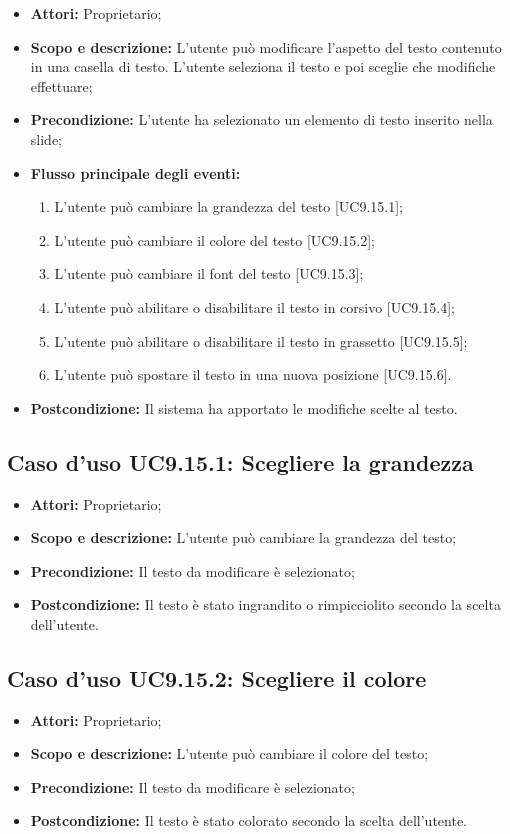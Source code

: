 \begin{itemize}
	\item \textbf{Attori:} Proprietario;
	\item \textbf{Scopo e descrizione:} L'utente può modificare l'aspetto del testo contenuto in una casella di testo. L'utente seleziona il testo e poi sceglie che modifiche effettuare;
	\item \textbf{Precondizione:} L'utente ha selezionato un elemento di testo inserito nella \gls{slide};
	\item \textbf{Flusso principale degli eventi:}
	\begin{enumerate}
		\item L'utente può cambiare la grandezza del testo [UC9.15.1];
		\item L'utente può cambiare il colore del testo [UC9.15.2];
		\item L'utente può cambiare il \gls{font} del testo [UC9.15.3];
		\item L'utente può abilitare o disabilitare il testo in corsivo [UC9.15.4];
		\item L'utente può abilitare o disabilitare il testo in grassetto [UC9.15.5];
		\item L'utente può spostare il testo in una nuova posizione [UC9.15.6].
	\end{enumerate}
	\item \textbf{Postcondizione:} Il sistema ha apportato le modifiche scelte al testo.
\end{itemize}

\subsection{Caso d'uso UC9.15.1: Scegliere la grandezza}
\begin{itemize}
	\item \textbf{Attori:} Proprietario;
	\item \textbf{Scopo e descrizione:} L'utente può cambiare la grandezza del testo;
	\item \textbf{Precondizione:} Il testo da modificare è selezionato;
	\item \textbf{Postcondizione:} Il testo è stato ingrandito o rimpicciolito secondo la scelta dell'utente.
\end{itemize}

\subsection{Caso d'uso UC9.15.2: Scegliere il colore}
\begin{itemize}
	\item \textbf{Attori:} Proprietario;
	\item \textbf{Scopo e descrizione:} L'utente può cambiare il colore del testo;
	\item \textbf{Precondizione:} Il testo da modificare è selezionato;
	\item \textbf{Postcondizione:} Il testo è stato colorato secondo la scelta dell'utente.
\end{itemize}

